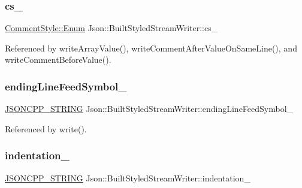 \subsubsection{\texorpdfstring{cs\+\_\+}{cs\_}}
{\footnotesize\ttfamily \hyperlink{structJson_1_1CommentStyle_a51fc08f3518fd81eba12f340d19a3d0c_a51fc08f3518fd81eba12f340d19a3d0c}{Comment\+Style\+::\+Enum} Json\+::\+Built\+Styled\+Stream\+Writer\+::cs\+\_\+\hspace{0.3cm}{\ttfamily [private]}}



Referenced by write\+Array\+Value(), write\+Comment\+After\+Value\+On\+Same\+Line(), and write\+Comment\+Before\+Value().

\mbox{\label{structJson_1_1BuiltStyledStreamWriter_a5e61a9a4b2af52b98900286c843b86f7_a5e61a9a4b2af52b98900286c843b86f7}} 
\subsubsection{\texorpdfstring{ending\+Line\+Feed\+Symbol\+\_\+}{endingLineFeedSymbol\_}}
{\footnotesize\ttfamily \hyperlink{json_8h_a1e723f95759de062585bc4a8fd3fa4be_a1e723f95759de062585bc4a8fd3fa4be}{J\+S\+O\+N\+C\+P\+P\+\_\+\+S\+T\+R\+I\+NG} Json\+::\+Built\+Styled\+Stream\+Writer\+::ending\+Line\+Feed\+Symbol\+\_\+\hspace{0.3cm}{\ttfamily [private]}}



Referenced by write().

\mbox{\label{structJson_1_1BuiltStyledStreamWriter_aaa4cbad91428ceca37cbabfc2a17a92d_aaa4cbad91428ceca37cbabfc2a17a92d}} 
\subsubsection{\texorpdfstring{indentation\+\_\+}{indentation\_}}
{\footnotesize\ttfamily \hyperlink{json_8h_a1e723f95759de062585bc4a8fd3fa4be_a1e723f95759de062585bc4a8fd3fa4be}{J\+S\+O\+N\+C\+P\+P\+\_\+\+S\+T\+R\+I\+NG} Json\+::\+Built\+Styled\+Stream\+Writer\+::indentation\+\_\+\hspace{0.3cm}{\ttfamily [private]}}



